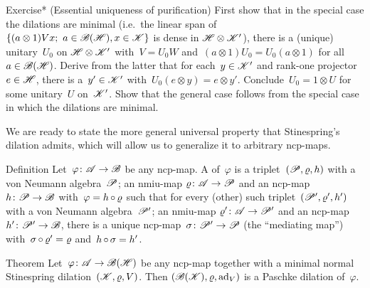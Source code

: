 \begin{parsec}
\begin{point}{Exercise* (Essential uniqueness of purification)}
    First show that in the special case the dilations are minimal
    (i.e.~the linear span of~$\{(a \otimes 1) V x;\  a \in \mathscr{B}(\mathscr{H}), x \in \mathscr{K}\}$ is dense
            in $\mathscr{H} \otimes \mathscr{K}'$),
        there is a (unique) unitary~$U_0$ on $\mathscr{H} \otimes \mathscr{K}'$
        with~$V = U_0 W$ and~$(a \otimes 1) U_0 = U_0 (a \otimes 1)$
            for all~$a \in \mathscr{B}(\mathscr{H})$.
    Derive from the latter
    that for each~$y \in \mathscr{K}'$ and rank-one projector~$e \in \mathscr{H}$,
        there is a~$y' \in \mathscr{K}'$
        with~$U_0 (e \otimes y) = e \otimes y'$.
    Conclude~$U_0 = 1 \otimes U$ for some unitary~$U$ on~$\mathscr{K}'$.
    Show  that the general case follows from the special case
        in which the dilations are minimal.
\end{point}
\end{parsec}
\begin{parsec}%
\begin{point}%
    We are ready to state the more general universal property
        that Stinespring's dilation admits,
        which will allow us to generalize it to arbitrary ncp-maps.
\end{point}
\begin{point}{Definition}%
    Let~$\varphi\colon \mathscr{A} \to \mathscr{B}$
        be any ncp-map.
    A  of~$\varphi$
    is a triplet~$(\mathscr{P}, \varrho, h)$
    with a von Neumann algebra~$\mathscr{P}$;
    an nmiu-map $\varrho \colon \mathscr{A} \to \mathscr{P}$
    and an ncp-map~$h \colon \mathscr{P} \to \mathscr{B}$
    with~$\varphi = h \mathop{\circ} \varrho$
    such that for every (other)
    such triplet~$(\mathscr{P}', \varrho', h')$
    with a von Neumann algebra~$\mathscr{P}'$;
    an nmiu-map $\varrho'\colon \mathscr{A} \to \mathscr{P}'$
    and an ncp-map~$h' \colon \mathscr{P}' \to \mathscr{B}$,
    there is a unique ncp-map~$\sigma \colon \mathscr{P}' \to \mathscr{P}$
    (the ``mediating map'')
    with~$\sigma \mathop{\circ} \varrho' = \varrho$
    and~$h \mathop{\circ} \sigma = h'$.
    \par %
\end{point}
\begin{point}{Theorem}%
Let~$\varphi\colon \mathscr{A} \to \mathscr{B}(\mathscr{H})$
    be any ncp-map
    together with a minimal normal Stinespring dilation~$(\mathscr{K},\varrho,V)$.
    Then $(\mathscr{B}(\mathscr{K}), \varrho, \mathrm{ad}_V)$
        is a Paschke dilation of~$\varphi$.


\end{point}
\end{parsec}
